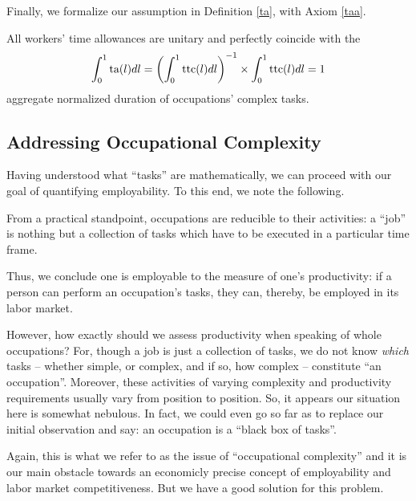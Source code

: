 \documentclass[hidelinks, nonatbib]{elsarticle}
\begin{document}
Finally, we formalize our assumption in Definition \ref{ta}, with Axiom \ref{taa}.
\begin{axiom}
    \label{taa}
    All workers' time allowances are unitary and perfectly coincide with the
    \begin{gather}
        \int_{0}^{1}
        \text{ta}(l)
        dl
        =
        \left(
            \int_{0}^{1}
            \text{ttc}(l)
            dl
        \right) ^ {-1}
        \times
        \int_{0}^{1}{
            \text{ttc}(l)
            dl
        }
        =
        1
    \end{gather}
    aggregate normalized duration of occupations' complex tasks.
\end{axiom}

\subsection{Addressing Occupational Complexity}
Having understood what ``tasks'' are mathematically, we can proceed with our goal of quantifying employability. To this end, we note the following.

\begin{observation}
    \label{oro}
    From a practical standpoint, occupations are reducible to their activities: a ``job'' is nothing but a collection of tasks which have to be executed in a particular time frame.
\end{observation}

Thus, we conclude one is employable to the measure of one's productivity: if a person can perform an occupation's tasks, they can, thereby, be employed in its labor market.

However, how exactly should we assess productivity when speaking of whole occupations? For, though a job is just a collection of tasks, we do not know \textit{which} tasks -- whether simple, or complex, and if so, how complex -- constitute ``an occupation''. Moreover, these activities of varying complexity and productivity requirements usually vary from position to position. So, it appears our situation here is somewhat nebulous. In fact, we could even go so far as to replace our initial observation and say: an occupation is a ``black box of tasks''.

Again, this is what we refer to as the issue of ``occupational complexity'' and it is our main obstacle towards an economicly precise concept of employability and labor market competitiveness. But we have a good solution for this problem.
\end{document}

